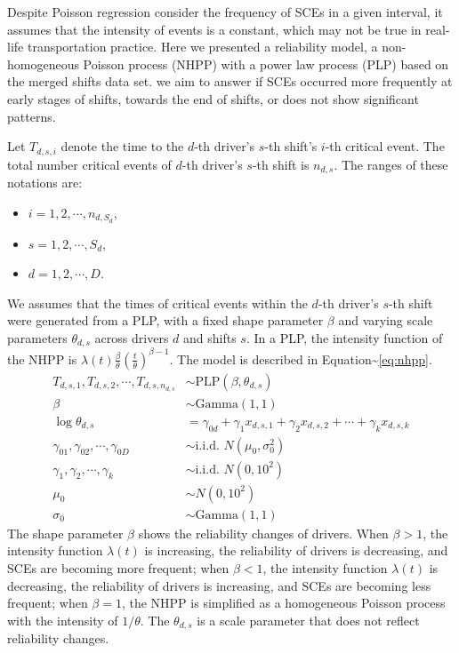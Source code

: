 \documentclass[12pt]{book}
\numberwithin{equation}{chapter}
\begin{document}
Despite Poisson regression consider the frequency of SCEs in a given interval, it assumes that the intensity of events is a constant, which may not be true in real-life transportation practice. Here we presented a reliability model, a non-homogeneous Poisson process (NHPP) with a power law process (PLP) based on the merged shifts data set. we aim to answer if SCEs occurred more frequently at early stages of shifts, towards the end of shifts, or does not show significant patterns.

Let \(T_{d, s, i}\) denote the time to the \(d\)-th driver's \(s\)-th shift's \(i\)-th critical event. The total number critical events of \(d\)-th driver's \(s\)-th shift is \(n_{d,s}\). The ranges of these notations are:

\begin{itemize}
\item $i = 1, 2, \cdots, n_{d, S_d}$,
\item $s = 1, 2, \cdots, S_d$,
\item $d = 1, 2, \cdots, D$.
\end{itemize}

We assumes that the times of critical events within the \(d\)-th driver's \(s\)-th shift were generated from a PLP, with a fixed shape parameter \(\beta\) and varying scale parameters \(\theta_{d, s}\) across drivers \(d\) and shifts \(s\). In a PLP, the intensity function of the NHPP is \(\lambda(t) \frac{\beta}{\theta}(\frac{t}{\theta})^{\beta-1}\). The model is described in Equation\textasciitilde{}\ref{eq:nhpp}.
\begin{equation}\label{eq:nhpp}
\begin{aligned}
  T_{d, s, 1}, T_{d, s, 2}, \cdots , T_{d, s, n_{d, s}} & \sim \text{PLP}(\beta, \theta_{d, s})\\
  \beta & \sim \text{Gamma}(1, 1)\\
  \log\theta_{d, s} &= \gamma_{0d} + \gamma_{1}x_{d, s, 1} + \gamma_{2}x_{d, s, 2} + \cdots + \gamma_{k}x_{d, s, k}\\
  \gamma_{01}, \gamma_{02}, \cdots, \gamma_{0D} & \sim \text{i.i.d. }N(\mu_0, \sigma_0^2)\\
  \gamma_1, \gamma_2, \cdots, \gamma_k & \sim \text{i.i.d. }N(0, 10^2)\\
  \mu_0 &\sim N(0, 10^2) \\
  \sigma_0 &\sim \text{Gamma}(1, 1)
\end{aligned}
\end{equation}
The shape parameter \(\beta\) shows the reliability changes of drivers. When \(\beta > 1\), the intensity function \(\lambda(t)\) is increasing, the reliability of drivers is decreasing, and SCEs are becoming more frequent; when \(\beta < 1\), the intensity function \(\lambda(t)\) is decreasing, the reliability of drivers is increasing, and SCEs are becoming less frequent; when \(\beta = 1\), the NHPP is simplified as a homogeneous Poisson process with the intensity of \(1/\theta\). The \(\theta_{d, s}\) is a scale parameter that does not reflect reliability changes.
\end{document}
